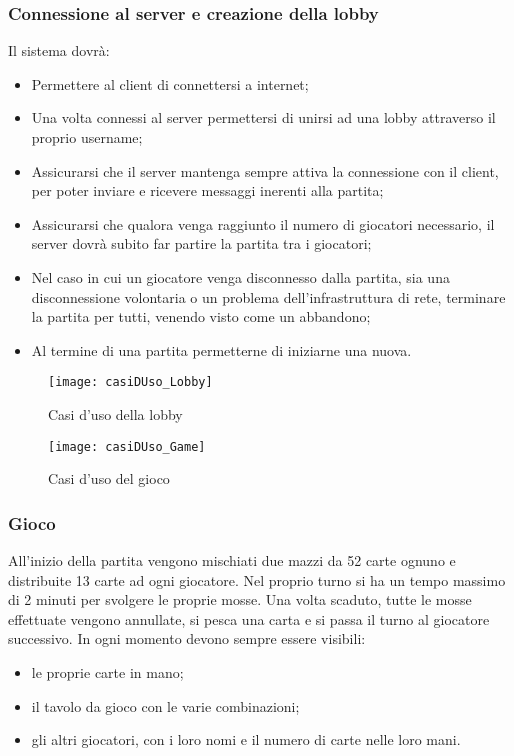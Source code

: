 \subsubsection{Connessione al server e creazione della lobby}
Il sistema dovrà:
\begin{itemize}
    \item Permettere al client di connettersi a internet;
    \item Una volta connessi al server permettersi di unirsi ad una lobby attraverso il proprio username;
    \item Assicurarsi che il server mantenga sempre attiva la connessione con il client, per poter inviare e ricevere messaggi inerenti alla partita;
    \item Assicurarsi che qualora venga raggiunto il numero di giocatori necessario, il server dovrà subito far partire la partita tra i giocatori;
    \item Nel caso in cui un giocatore venga disconnesso dalla partita, sia una disconnessione volontaria o un problema dell’infrastruttura di rete, terminare la partita per tutti, venendo visto come un abbandono;
    \item Al termine di una partita permetterne di iniziarne una nuova.
\end{itemize}
\begin{figure}
    \centering
    \texttt{[image: casiDUso\_Lobby]}
    \caption{Casi d'uso della lobby}
\end{figure}
\begin{figure}
    \centering
    \texttt{[image: casiDUso\_Game]}
    \caption{Casi d'uso del gioco}
\end{figure}
\subsubsection{Gioco}
All’inizio della partita vengono mischiati due mazzi da 52 carte ognuno e distribuite 13 carte ad ogni giocatore.
Nel proprio turno si ha un tempo massimo di 2 minuti per svolgere le proprie mosse.
Una volta scaduto, tutte le mosse effettuate vengono annullate, si pesca una carta e si passa il turno al giocatore successivo.
In ogni momento devono sempre essere visibili:
\begin{itemize}
    \item le proprie carte in mano;
    \item il tavolo da gioco con le varie combinazioni;
    \item gli altri giocatori, con i loro nomi e il numero di carte nelle loro mani.
\end{itemize}

